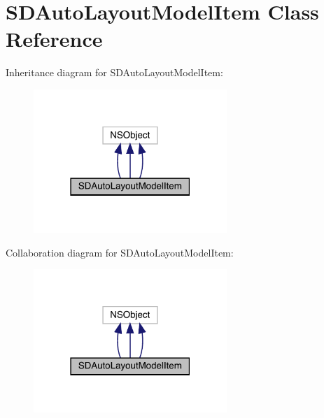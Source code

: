 \hypertarget{interface_s_d_auto_layout_model_item}{}\section{S\+D\+Auto\+Layout\+Model\+Item Class Reference}
\label{interface_s_d_auto_layout_model_item}


Inheritance diagram for S\+D\+Auto\+Layout\+Model\+Item\+:\nopagebreak
\begin{figure}[H]
\begin{center}
\leavevmode
\includegraphics[width=207pt]{interface_s_d_auto_layout_model_item__inherit__graph}
\end{center}
\end{figure}


Collaboration diagram for S\+D\+Auto\+Layout\+Model\+Item\+:\nopagebreak
\begin{figure}[H]
\begin{center}
\leavevmode
\includegraphics[width=207pt]{interface_s_d_auto_layout_model_item__coll__graph}
\end{center}
\end{figure}
